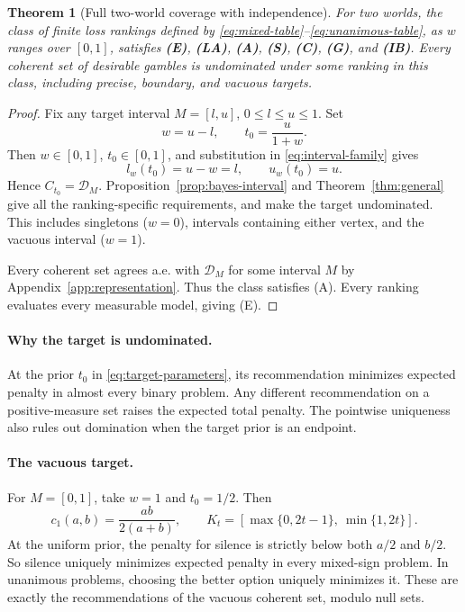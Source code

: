 \documentclass[11pt]{article}
\newtheorem{theorem}{Theorem}
\theoremstyle{remark}
\newcommand{\Dscr}{\mathcal D}
\begin{document}
\begin{theorem}[Full two-world coverage with independence]\label{thm:full}
For two worlds, the class of finite loss rankings defined by
\eqref{eq:mixed-table}--\eqref{eq:unanimous-table}, as $w$ ranges over $[0,1]$,
satisfies \textbf{(E)}, \textbf{(LA)}, \textbf{(A)}, \textbf{(S)}, \textbf{(C)},
\textbf{(G)}, and \textbf{(IB)}. Every coherent set of desirable gambles is
undominated under some ranking in this class, including precise, boundary,
and vacuous targets.
\end{theorem}
\begin{proof}
Fix any target interval $M=[l,u]$, $0\le l\le u\le1$. Set
\begin{equation}
 \boxed{\quad w=u-l,\qquad t_0=\frac{u}{1+w}.\quad}
 \label{eq:target-parameters}
\end{equation}
Then $w\in[0,1]$, $t_0\in[0,1]$, and substitution in
\eqref{eq:interval-family} gives
\[
 l_w(t_0)=u-w=l,\qquad u_w(t_0)=u.
\]
Hence $C_{t_0}=\Dscr_M$. Proposition~\ref{prop:bayes-interval} and
Theorem~\ref{thm:general} give all the ranking-specific requirements, and
make the target undominated. This includes singletons ($w=0$), intervals
containing either vertex, and the vacuous interval ($w=1$).

Every coherent set agrees a.e. with $\Dscr_M$ for some interval $M$ by
Appendix~\ref{app:representation}. Thus the class satisfies (A). Every ranking
evaluates every measurable model, giving (E).
\end{proof}

\paragraph{Why the target is undominated.}
At the prior $t_0$ in \eqref{eq:target-parameters}, its recommendation minimizes
expected penalty in almost every binary problem. Any different recommendation
on a positive-measure set raises the expected total penalty. The pointwise
uniqueness also rules out domination when the target prior is an endpoint.

\paragraph{The vacuous target.}
For $M=[0,1]$, take $w=1$ and $t_0=1/2$. Then
\begin{equation}
 c_1(a,b)=\frac{ab}{2(a+b)},\qquad
 K_t=[\max\{0,2t-1\},\ \min\{1,2t\}].
 \label{eq:vacuous}
\end{equation}
At the uniform prior, the penalty for silence is strictly below both $a/2$
and $b/2$. So silence uniquely minimizes expected penalty in every
mixed-sign problem. In unanimous problems, choosing the better option
uniquely minimizes it. These are exactly the recommendations of the vacuous
coherent set, modulo null sets.
\end{document}
